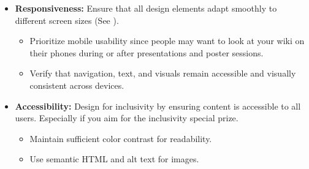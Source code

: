 \begin{itemize}
    \item \textbf{Responsiveness:} Ensure that all design elements adapt smoothly to different screen sizes (See ).
    \begin{itemize}
        \item Prioritize mobile usability since people may want to look at your wiki on their phones during or after presentations and poster sessions.
        \item Verify that navigation, text, and visuals remain accessible and visually consistent across devices.
    \end{itemize}
    \item \textbf{Accessibility:} Design for inclusivity by ensuring content is accessible to all users.
    Especially if you aim for the inclusivity special prize. 
    \begin{itemize}
        \item Maintain sufficient color contrast for readability.
        \item Use semantic HTML and alt text for images.
    \end{itemize}
\end{itemize}

